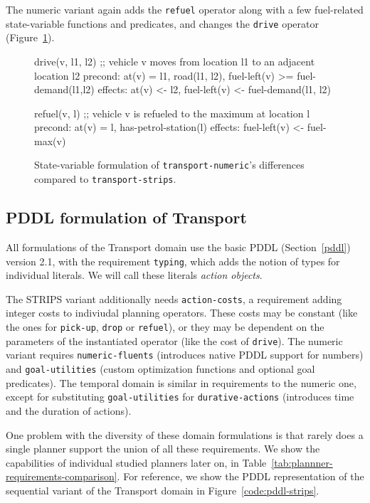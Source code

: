 The numeric variant again adds the \verb+refuel+ operator along with
a few fuel-related state-variable functions and predicates, and changes 
the \verb+drive+ operator (Figure~\ref{code:statevar-numeric}).

\begin{figure}[tb]
\begin{code}
drive(v, l1, l2)
  ;; vehicle v moves from location l1 to an adjacent location l2
  precond: at(v) = l1, road(l1, l2), fuel-left(v) >= fuel-demand(l1,l2)
  effects: at(v) <- l2, fuel-left(v) <-  fuel-demand(l1, l2)
  
refuel(v, l)
  ;; vehicle v is refueled to the maximum at location l
  precond: at(v) = l, has-petrol-station(l)
  effects: fuel-left(v) <- fuel-max(v)
\end{code}
\caption{State-variable formulation of \texttt{transport-numeric}'s differences
compared to \texttt{transport-strips}.}
\label{code:statevar-numeric}
\end{figure}


\subsection{PDDL formulation of Transport}

All formulations of the Transport domain use the basic PDDL (Section~\ref{pddl}) version 2.1,
with the requirement \verb+typing+, which adds the notion of types for individual
literals. We will call these literals \textit{action objects}.

The STRIPS variant additionally needs \verb+action-costs+, a requirement adding
integer costs to indiviudal planning operators. These costs may be constant
(like the ones for \verb+pick-up+, \verb+drop+ or \verb+refuel+),
or they may be dependent on the parameters of the instantiated operator (like
the cost of \verb+drive+).
The numeric variant
requires \verb+numeric-fluents+ (introduces native PDDL support for numbers) and
\verb+goal-utilities+ (custom optimization functions and optional goal predicates).
The temporal domain is similar in requirements to the numeric one, except for
substituting \verb+goal-utilities+ for \verb+durative-actions+ (introduces time
and the duration of actions).

One problem with the diversity of these domain formulations is that rarely does
a single planner support the union of all these requirements.
We show the capabilities of individual studied planners
later on, in Table~\ref{tab:plannner-requirements-comparison}.
For reference, we show the PDDL representation of the sequential variant of
the Transport domain in Figure~\ref{code:pddl-strips}.


